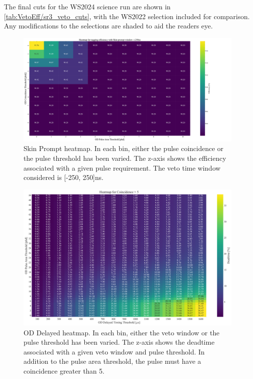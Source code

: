 \noindent
The final cuts for the WS2024 science run are shown in \autoref{tab:VetoEff/sr3_veto_cuts}, with the WS2022 selection included for comparison. Any modifications to the selections are shaded to aid the readers eye.

\iffalse
\begin{figure}
	\centering
	\includegraphics[width=\textwidth]{figures/VetoEfficiency/HeatmapSkinPACoinScanWindow500.pdf}
	\caption{Skin Prompt heatmap.
		In each bin, either the pulse coincidence or the pulse threshold has been varied.
		The z-axis shows the efficiency associated with a given pulse requirement.
		The veto time window considered is [-250, 250]ns.}
	\label{fig:VetoEff/skin_prompt_veto_heatmap}
\end{figure}
\begin{figure}
	\centering
	\includegraphics[width=\textwidth]{figures/VetoEfficiency/OD_Deadtime_thesis.png}
	\caption{OD Delayed heatmap.
		In each bin, either the veto window or the pulse threshold has been varied.
		The z-axis shows the deadtime associated with a given veto window and pulse threshold.
		In addition to the pulse area threshold, the pulse must have a coincidence greater than 5.}
	\label{fig:VetoEff/od_delayed_veto_heatmap}
\end{figure}
